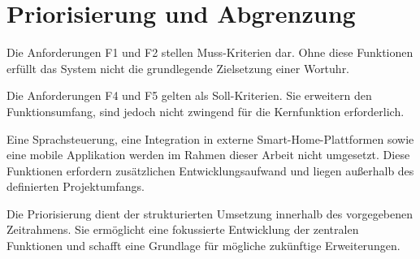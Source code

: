 \section{Priorisierung und Abgrenzung} 
Die Anforderungen F1 und F2 stellen Muss-Kriterien dar. Ohne diese Funktionen erfüllt das System nicht die grundlegende Zielsetzung einer Wortuhr.

Die Anforderungen F4 und F5 gelten als Soll-Kriterien. Sie erweitern den Funktionsumfang, sind jedoch nicht zwingend für die Kernfunktion erforderlich.

Eine Sprachsteuerung, eine Integration in externe Smart-Home-Plattformen sowie eine mobile Applikation werden im Rahmen dieser Arbeit nicht umgesetzt. Diese Funktionen erfordern zusätzlichen Entwicklungsaufwand und liegen außerhalb des definierten Projektumfangs.

Die Priorisierung dient der strukturierten Umsetzung innerhalb des vorgegebenen Zeitrahmens. Sie ermöglicht eine fokussierte Entwicklung der zentralen Funktionen und schafft eine Grundlage für mögliche zukünftige Erweiterungen.
